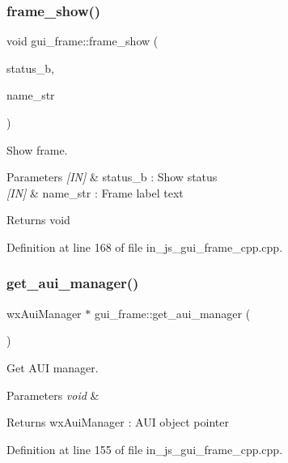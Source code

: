 \subsubsection{frame\_show()}
{\footnotesize\ttfamily void gui\+\_\+frame\+::frame\+\_\+show (\begin{DoxyParamCaption}\item[{bool}]{status\+\_\+b,  }\item[{wx\+String}]{name\+\_\+str }\end{DoxyParamCaption})}



Show frame. 


\begin{DoxyParams}{Parameters}
{\em \mbox{[}\+I\+N\mbox{]}} & status\+\_\+b \+: Show status \\
\hline
{\em \mbox{[}\+I\+N\mbox{]}} & name\+\_\+str \+: Frame label text \\
\hline
\end{DoxyParams}
\begin{DoxyReturn}{Returns}
void 
\end{DoxyReturn}


Definition at line 168 of file in\+\_\+js\+\_\+gui\+\_\+frame\+\_\+cpp.\+cpp.

\mbox{\label{group___g_u_i_ga9c9714bb4592f587710bca6fd10b91a7}} 
\subsubsection{get\_aui\_manager()}
{\footnotesize\ttfamily wx\+Aui\+Manager $\ast$ gui\+\_\+frame\+::get\+\_\+aui\+\_\+manager (\begin{DoxyParamCaption}\item[{void}]{ }\end{DoxyParamCaption})}



Get A\+UI manager. 


\begin{DoxyParams}{Parameters}
{\em void} & \\
\hline
\end{DoxyParams}
\begin{DoxyReturn}{Returns}
wx\+Aui\+Manager \+: A\+UI object pointer 
\end{DoxyReturn}


Definition at line 155 of file in\+\_\+js\+\_\+gui\+\_\+frame\+\_\+cpp.\+cpp.


